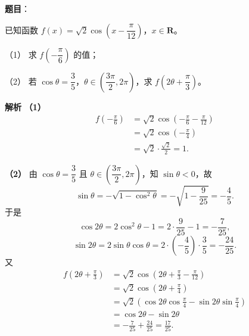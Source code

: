 \begin{answer}

\textbf{题目}：

已知函数 $f(x)=\sqrt2\cos\left(x-\dfrac{\pi}{12}\right)$，$x\in\mathbf R$。

（1） 求 $f\left(-\dfrac{\pi}{6}\right)$ 的值；

（2） 若 $\cos\theta=\dfrac35$，$\theta\in\left(\dfrac{3\pi}{2},2\pi\right)$，求 $f\left(2\theta+\dfrac{\pi}{3}\right)$。

\textbf{解析}
\textbf{（1）}
\nopagebreak[4]
\[\begin{aligned}
f\left(-\frac{\pi}{6}\right)
&=\sqrt2\cos\left(-\frac{\pi}{6}-\frac{\pi}{12}\right)\\
&=\sqrt2\cos\left(-\frac{\pi}{4}\right)\\
&=\sqrt2\cdot\frac{\sqrt2}{2}=1.
\end{aligned}\]

\textbf{（2）}
由 $\cos\theta=\dfrac35$ 且 $\theta\in\left(\dfrac{3\pi}{2},2\pi\right)$，知 $\sin\theta<0$，故
\nopagebreak[4]
\[\sin\theta=-\sqrt{1-\cos^2\theta}=-\sqrt{1-\frac9{25}}=-\frac45.\]
于是
\nopagebreak[4]
\[\cos2\theta=2\cos^2\theta-1=2\cdot\frac9{25}-1=-\frac7{25},\]
\nopagebreak[4]
\[\sin2\theta=2\sin\theta\cos\theta=2\cdot\left(-\frac45\right)\cdot\frac35=-\frac{24}{25}.\]
又
\nopagebreak[4]
\[\begin{aligned}
f\left(2\theta+\frac{\pi}{3}\right)
&=\sqrt2\cos\left(2\theta+\frac{\pi}{3}-\frac{\pi}{12}\right)\\
&=\sqrt2\cos\left(2\theta+\frac{\pi}{4}\right)\\
&=\sqrt2\left(\cos2\theta\cos\frac{\pi}{4}-\sin2\theta\sin\frac{\pi}{4}\right)\\
&=\cos2\theta-\sin2\theta\\
&=-\frac7{25}+\frac{24}{25}=\frac{17}{25}.
\end{aligned}\]



\end{answer}

